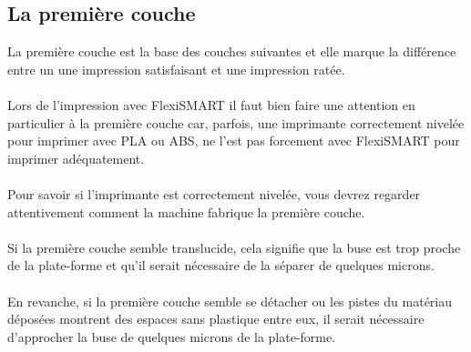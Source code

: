 \documentclass[11pt,a4paper]{article}
\begin{document}
	\subsection{La première couche}
La première couche est la base des couches suivantes et elle marque la différence entre un une impression satisfaisant et une impression ratée.
\\\\
Lors de l’impression avec FlexiSMART il faut bien faire une attention en particulier à la première couche car, parfois, une imprimante correctement nivelée pour imprimer avec PLA ou ABS, ne l’est pas forcement avec FlexiSMART pour imprimer adéquatement.
\\\\
Pour savoir si l'imprimante est correctement nivelée, vous devrez regarder attentivement comment la machine fabrique la première couche.
\\\\
Si la première couche semble translucide, cela signifie que la buse est trop proche de la plate-forme et qu’il serait nécessaire de la séparer de quelques microns.
\\\\
En revanche, si la première couche semble se détacher ou les pistes du matériau déposées montrent des espaces sans plastique entre eux, il serait nécessaire d’approcher la buse de quelques microns de la plate-forme.
\end{document}
